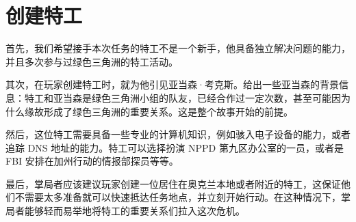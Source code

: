 \section{创建特工}

首先，我们希望接手本次任务的特工不是一个新手，他具备独立解决问题的能力，并且多次参与过绿色三角洲的特工活动。

其次，在玩家创建特工时，就为他引见亚当森·考克斯。给出一些亚当森的背景信息：特工和亚当森是绿色三角洲小组的队友，已经合作过一定次数，甚至可能因为什么缘故形成了绿色三角洲的重要关系。这是整个故事开始的前提。

然后，这位特工需要具备一些专业的计算机知识，例如骇入电子设备的能力，或者追踪 DNS 地址的能力。特工可以选择扮演 NPPD 第九区办公室的一员，或者是 FBI 安排在加州行动的情报部探员等等。

最后，掌局者应该建议玩家创建一位居住在奥克兰本地或者附近的特工，这保证他们不需要太多准备就可以快速抵达任务地点，并立刻开始行动。在这种情况下，掌局者能够轻而易举地将特工的重要关系们拉入这次危机。